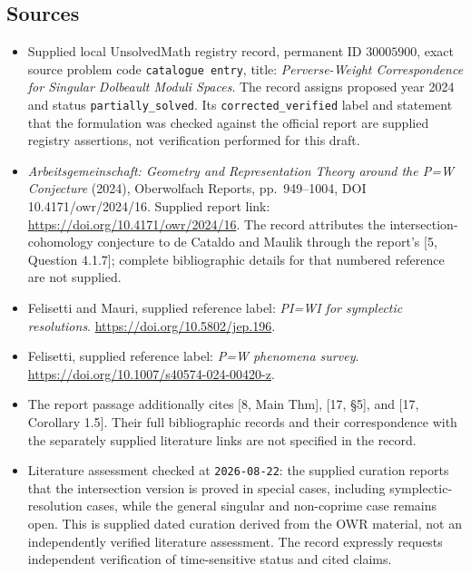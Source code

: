 \documentclass[11pt]{article}
\begin{document}
\subsection{Sources}
\begin{itemize}
\item Supplied local UnsolvedMath registry record, permanent ID \(30005900\), exact source problem code \texttt{catalogue entry}, title: \emph{Perverse-Weight Correspondence for Singular Dolbeault Moduli Spaces}. The record assigns proposed year 2024 and status \texttt{partially\_solved}. Its \texttt{corrected\_verified} label and statement that the formulation was checked against the official report are supplied registry assertions, not verification performed for this draft.
\item \emph{Arbeitsgemeinschaft: Geometry and Representation Theory around the P=W Conjecture} (2024), Oberwolfach Reports, pp.~949--1004, DOI 10.4171/owr/2024/16. Supplied report link: \url{https://doi.org/10.4171/owr/2024/16}. The record attributes the intersection-cohomology conjecture to de Cataldo and Maulik through the report's [5, Question 4.1.7]; complete bibliographic details for that numbered reference are not supplied.
\item Felisetti and Mauri, supplied reference label: \emph{PI=WI for symplectic resolutions}. \url{https://doi.org/10.5802/jep.196}.
\item Felisetti, supplied reference label: \emph{P=W phenomena survey}. \url{https://doi.org/10.1007/s40574-024-00420-z}.
\item The report passage additionally cites [8, Main Thm], [17, \S5], and [17, Corollary 1.5]. Their full bibliographic records and their correspondence with the separately supplied literature links are not specified in the record.
\item Literature assessment checked at \texttt{2026-08-22}: the supplied curation reports that the intersection version is proved in special cases, including symplectic-resolution cases, while the general singular and non-coprime case remains open. This is supplied dated curation derived from the OWR material, not an independently verified literature assessment. The record expressly requests independent verification of time-sensitive status and cited claims.
\end{itemize}
\end{document}
